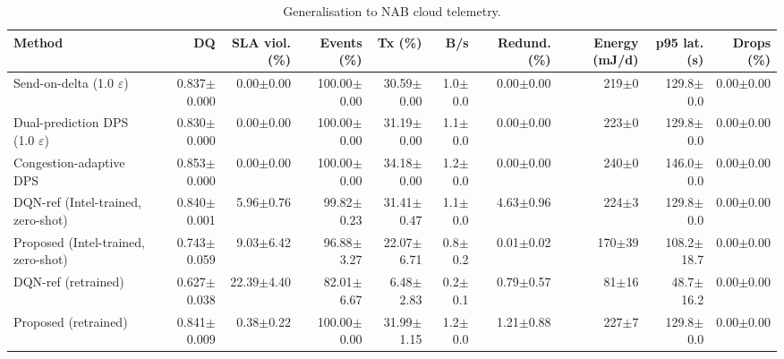 \begin{table}[t]
\centering
\caption{Generalisation to NAB cloud telemetry.}
\label{tab:nab}
\footnotesize
\begin{tabular}{lrrrrrrrrr}
\toprule
Method & DQ & SLA viol. (\%) & Events (\%) & Tx (\%) & B/s & Redund. (\%) & Energy (mJ/d) & p95 lat. (s) & Drops (\%) \\
\midrule
Send-on-delta (1.0 $\varepsilon$) & 0.837$\pm$0.000 & 0.00$\pm$0.00 & 100.00$\pm$0.00 & 30.59$\pm$0.00 & 1.0$\pm$0.0 & 0.00$\pm$0.00 & 219$\pm$0 & 129.8$\pm$0.0 & 0.00$\pm$0.00 \\
Dual-prediction DPS (1.0 $\varepsilon$) & 0.830$\pm$0.000 & 0.00$\pm$0.00 & 100.00$\pm$0.00 & 31.19$\pm$0.00 & 1.1$\pm$0.0 & 0.00$\pm$0.00 & 223$\pm$0 & 129.8$\pm$0.0 & 0.00$\pm$0.00 \\
Congestion-adaptive DPS & 0.853$\pm$0.000 & 0.00$\pm$0.00 & 100.00$\pm$0.00 & 34.18$\pm$0.00 & 1.2$\pm$0.0 & 0.00$\pm$0.00 & 240$\pm$0 & 146.0$\pm$0.0 & 0.00$\pm$0.00 \\
DQN-ref (Intel-trained, zero-shot) & 0.840$\pm$0.001 & 5.96$\pm$0.76 & 99.82$\pm$0.23 & 31.41$\pm$0.47 & 1.1$\pm$0.0 & 4.63$\pm$0.96 & 224$\pm$3 & 129.8$\pm$0.0 & 0.00$\pm$0.00 \\
Proposed (Intel-trained, zero-shot) & 0.743$\pm$0.059 & 9.03$\pm$6.42 & 96.88$\pm$3.27 & 22.07$\pm$6.71 & 0.8$\pm$0.2 & 0.01$\pm$0.02 & 170$\pm$39 & 108.2$\pm$18.7 & 0.00$\pm$0.00 \\
DQN-ref (retrained) & 0.627$\pm$0.038 & 22.39$\pm$4.40 & 82.01$\pm$6.67 & 6.48$\pm$2.83 & 0.2$\pm$0.1 & 0.79$\pm$0.57 & 81$\pm$16 & 48.7$\pm$16.2 & 0.00$\pm$0.00 \\
Proposed (retrained) & 0.841$\pm$0.009 & 0.38$\pm$0.22 & 100.00$\pm$0.00 & 31.99$\pm$1.15 & 1.2$\pm$0.0 & 1.21$\pm$0.88 & 227$\pm$7 & 129.8$\pm$0.0 & 0.00$\pm$0.00 \\
\bottomrule
\end{tabular}
\end{table}
